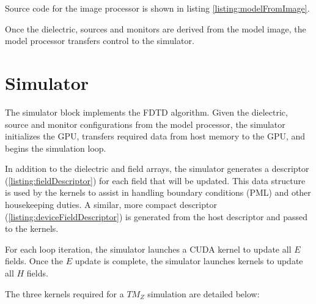 Source code for the image processor is shown in listing \autoref{listing:modelFromImage}.



Once the dielectric, sources and monitors are derived from the model image, the model processor transfers control to the simulator.

\section{Simulator}\label{sec:simulator}

The simulator block implements the FDTD algorithm. Given the dielectric, source and monitor configurations from the model processor, the simulator initializes the GPU, transfers required data from host memory to the GPU, and begins the simulation loop.

In addition to the dielectric and field arrays, the simulator generates a  descriptor (\ref{listing:fieldDescriptor}) for each field that will be updated. This data structure is used by the kernels to assist in handling boundary conditions (PML) and other housekeeping duties. A similar, more compact  descriptor (\ref{listing:deviceFieldDescriptor}) is generated from the host descriptor and passed to the kernels.
\pagebreak




For each loop iteration, the simulator launches a CUDA kernel to update all $E$ fields. Once the $E$ update is complete, the simulator launches kernels to update all $H$ fields.

The three kernels required for a $TM_Z$ simulation are detailed below:



